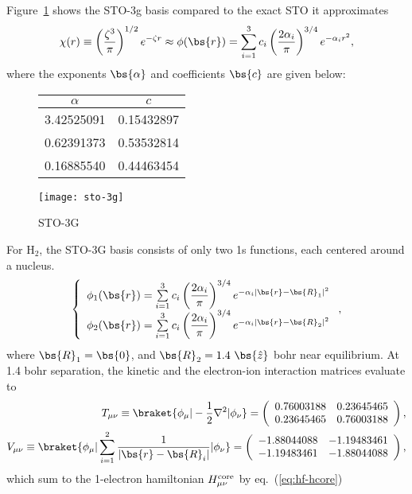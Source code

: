 Figure~\ref{fig:sto-3g} shows the STO-3g basis compared to the exact STO it approximates
\begin{align}
\chi(r)\equiv \left(\dfrac{\zeta^3}{\pi}\right)^{1/2} e^{-\zeta r} \approx \phi(\bs{r}) = \sum\limits_{i=1}^3 c_i \left(\dfrac{2\alpha_i}{\pi}\right)^{3/4} e^{-\alpha_ir^2},
\end{align}
where the exponents $\bs{\alpha}$ and coefficients $\bs{c}$ are given below:
\begin{figure}[h]
\begin{minipage}{0.29\textwidth}
\begin{tabular}{cc}
\toprule
$\alpha$ & $c$ \\
\midrule
3.42525091 & 0.15432897 \\
0.62391373 & 0.53532814 \\
0.16885540 & 0.44463454 \\
\bottomrule
\end{tabular}
\end{minipage}
\begin{minipage}{0.59\textwidth}
\texttt{[image: sto-3g]}
\end{minipage}
\caption{STO-3G}
\label{fig:sto-3g}
\end{figure}

For H$_2$, the STO-3G basis consists of only two 1s functions, each centered around a nucleus.
\begin{align}
\left\{\begin{array}{l}
\phi_1(\bs{r}) = \sum\limits_{i=1}^3 c_i \left(\dfrac{2\alpha_i}{\pi}\right)^{3/4} e^{-\alpha_i\vert\bs{r}-\bs{R}_1\vert^2} \\
\phi_2(\bs{r}) = \sum\limits_{i=1}^3 c_i \left(\dfrac{2\alpha_i}{\pi}\right)^{3/4} e^{-\alpha_i\vert\bs{r}-\bs{R}_2\vert^2}
\end{array}\right.,
\end{align}
where $\bs{R}_1=\bs{0}$, and $\bs{R}_2=1.4~\bs{\hat{z}}$ bohr near equilibrium. At 1.4 bohr separation, the kinetic and the electron-ion interaction matrices evaluate to
\begin{align}
T_{\mu\nu}\equiv\braket{\phi_\mu|-\frac{1}{2}\nabla^2|\phi_\nu} =
\left(\begin{array}{cc}
0.76003188 & 0.23645465 \\
0.23645465 & 0.76003188
\end{array}\right), \\
V_{\mu\nu}\equiv\braket{\phi_\mu|\sum\limits_{i=1}^{2}\dfrac{1}{\vert\bs{r}-\bs{R}_i\vert}|\phi_\nu} = \left(\begin{array}{cc}
-1.88044088 & -1.19483461 \\
-1.19483461 & -1.88044088
\end{array}\right),
\end{align}
which sum to the 1-electron hamiltonian $H^{\text{core}}_{\mu\nu}$ by eq.~(\ref{eq:hf-hcore})

